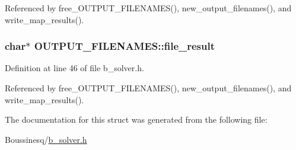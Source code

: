 Referenced by free\-\_\-\-O\-U\-T\-P\-U\-T\-\_\-\-F\-I\-L\-E\-N\-A\-M\-E\-S(), new\-\_\-output\-\_\-filenames(), and write\-\_\-map\-\_\-results().

\hypertarget{struct_o_u_t_p_u_t___f_i_l_e_n_a_m_e_s_ae980a071a2f3e304d192ef8263a1e4a0}{
\subsubsection[{file\-\_\-result}]{\setlength{\rightskip}{0pt plus 5cm}char$\ast$ O\-U\-T\-P\-U\-T\-\_\-\-F\-I\-L\-E\-N\-A\-M\-E\-S\-::file\-\_\-result}}\label{struct_o_u_t_p_u_t___f_i_l_e_n_a_m_e_s_ae980a071a2f3e304d192ef8263a1e4a0}


Definition at line 46 of file b\-\_\-solver.\-h.



Referenced by free\-\_\-\-O\-U\-T\-P\-U\-T\-\_\-\-F\-I\-L\-E\-N\-A\-M\-E\-S(), new\-\_\-output\-\_\-filenames(), and write\-\_\-map\-\_\-results().



The documentation for this struct was generated from the following file\-:\begin{DoxyCompactItemize}
\item 
Boussinesq/\hyperlink{b__solver_8h}{b\-\_\-solver.\-h}\end{DoxyCompactItemize}
